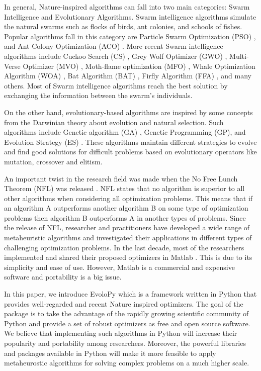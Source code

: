 \documentclass[a4paper,twoside]{article}
\begin{document}
In general, Nature-inspired algorithms can fall into two main categories: Swarm Intelligence and Evolutionary Algorithms. Swarm intelligence algorithms simulate the natural swarms such as flocks of birds, ant colonies, and schools of fishes. Popular algorithms fall in this category are Particle Swarm Optimization (PSO) \cite{Kennedy95}, and Ant Colony Optimization (ACO) \cite{Koro_ec_2009}. More recent Swarm intelligence algorithms include Cuckoo Search (CS) \cite{Yang2009}, Grey Wolf Optimizer (GWO) \cite{Mirjalili201446}, Multi-Verse Optimizer (MVO) \cite{Mirjalili2016}, Moth-flame optimization (MFO) \cite{Mirjalili2015228}, Whale Optimization Algorithm (WOA) \cite{Mirjalili201651}, Bat Algorithm (BAT) \cite{Yang2010}, Firfly Algorithm (FFA) \cite{Yang2010FFA}, and many others. Most of Swarm intelligence algorithms reach the best solution by exchanging the information between the swarm's individuals. 

On the other hand, evolutionary-based algorithms are inspired by some concepts from the Darwinian theory about evolution and natural selection. Such algorithms include Genetic algorithm (GA) \cite{Holland92}, Genetic Programming (GP)\cite{Koza1992}, and Evolution Strategy (ES) \cite{Beyer2002}. These algorithms maintain different strategies to evolve and find good solutions for difficult problems based on evolutionary operators like mutation, crossover and elitism. 

An important twist in the research field was made when the No Free Lunch Theorem (NFL) was released \cite{wolpert1997no,ho2002simple}. NFL states that no algorithm is superior to all other algorithms when considering all optimization problems. This means that if an algorithm A outperforms another algorithm B on some type of optimization problems then algorithm B outperforms A in another types of problems. Since the release of NFL, researcher and practitioners have developed a wide range of metaheuristic algorithms and investigated their applications in different types of challenging optimization problems. In the last decade, most of the researchers implemented and shared their proposed optimizers in Matlab \cite{Yang2010FFA,Yang2010,Mirjalili201446,Mirjalili2015228}. This is due to its simplicity and ease of use. However, Matlab is a commercial and expensive software and portability is a big issue.

In this paper, we introduce EvoloPy which is a framework written in Python that provides well-regarded and recent Nature inspired optimizers. The goal of the package is to take the advantage of the rapidly growing scientific community of Python and provide a set of robust optimizers as free and open source software. We believe that implementing such algorithms in Python will increase their popularity and portability among researchers. Moreover, the powerful libraries and packages available in Python will make it more feasible to apply metaheurostic algorithms for solving complex problems on a much higher scale.
\end{document}
